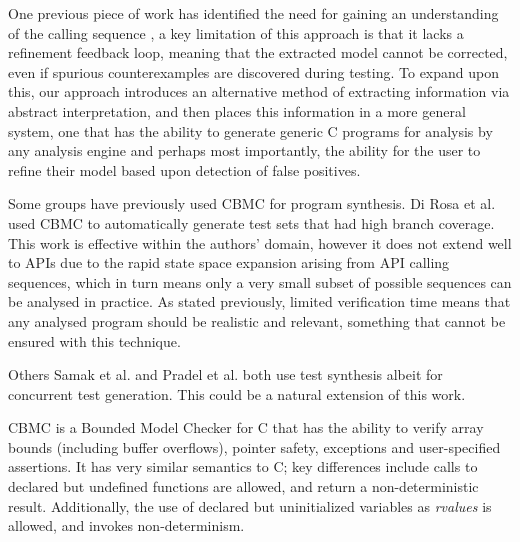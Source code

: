 \documentclass[EPiC]{easychair}
\begin{document}
One previous piece of work has identified the need for gaining an understanding of the calling sequence \cite{Acharya2009a}, a key limitation of this approach is that it lacks a refinement feedback loop, meaning that the extracted model cannot be corrected, even if spurious counterexamples are discovered during testing.  To expand upon this,  our approach introduces an alternative method of extracting information via abstract interpretation, and then places this information in a more general system, one that has the ability to generate generic C programs for analysis by any analysis engine and perhaps most importantly, the ability for the user to refine their model based upon detection of false positives.  




Some groups have previously used CBMC \cite{Kroening2014} for program synthesis.  Di Rosa et al.~\cite{VERIFY-2010:Automatic_generation_of_high_quality_test_sets_via_CBMC} used CBMC to automatically generate test sets that had high branch coverage.  This work is effective within the authors' domain, however it does not extend well to APIs due to the rapid state space expansion arising from API calling sequences, which in turn means only a very small subset of possible sequences can be analysed in practice.  As stated previously, limited verification time means that any analysed program should be realistic and relevant, something that cannot be ensured with this technique.


Others Samak et al. \cite{Samak2015} and Pradel et al.  \cite{Pradel2012} both use test synthesis albeit for concurrent test generation.  This could be a natural extension of this work.

CBMC \cite{Kroening2014} is a Bounded Model Checker for C that has the ability to verify array bounds (including buffer overflows), pointer safety, exceptions and user-specified assertions. It has very similar semantics to C;  key differences include calls to declared but undefined functions are allowed, and return a non-deterministic result.  Additionally, the use of declared but uninitialized variables as \textit{rvalues} is allowed, and invokes non-determinism.
\end{document}
